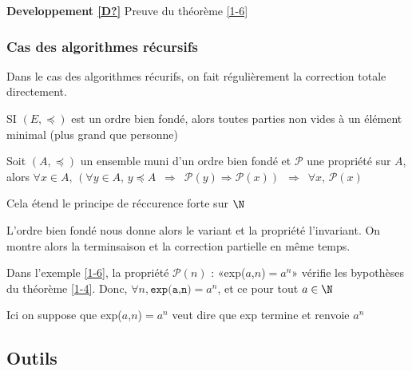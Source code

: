 \textbf{Developpement \ref{D?}} Preuve du théorème \ref{1-6}

\subsubsection{Cas des algorithmes récursifs}

Dans le cas des algorithmes récurifs, on fait régulièrement la correction totale directement.

\begin{proposition}
	SI $(E, \preceq)$ est un ordre bien fondé, alors toutes parties non vides à un élément minimal (plus grand que personne)
\end{proposition}

\begin{theorem}
	\label{1-4}
	Soit $(A, \preceq)$ un ensemble muni d'un ordre bien fondé et $\mathcal P$ une propriété sur $A$, alors $\forall x \in A, \, (\forall y \in A, \, y \preceq A \enspace \Rightarrow \enspace \mathcal P(y) \Rightarrow \mathcal P(x)) \enspace \Rightarrow \enspace \forall x ,\, \mathcal P(x)$
\end{theorem}

\begin{rem}
	Cela étend le principe de réccurence forte sur $\N$
\end{rem}

L'ordre bien fondé nous donne alors le variant et la propriété l'invariant. On montre alors la terminsaison et la correction partielle en même temps.

\begin{example}
	Dans l'exemple \ref{1-6}, la propriété $\mathcal P(n)$ : «exp($a$,$n$)$ = a^n$» vérifie les bypothèses du théorème \ref{1-4}. Donc, $\forall n, \texttt{exp(a,n)} = a^n$, et ce pour tout $a\in \N$
\end{example}

\begin{com}
	Ici on suppose que exp($a$,$n$)$ = a^n$ veut dire que exp termine et renvoie $a^n$
\end{com}

\subsection{Outils}

